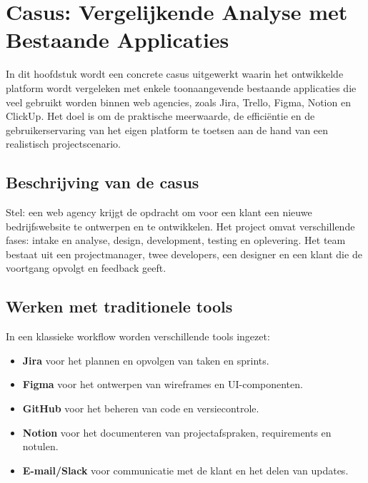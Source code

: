 \chapter{Casus: Vergelijkende Analyse met Bestaande Applicaties}
\label{ch:casus-vergelijking}

In dit hoofdstuk wordt een concrete casus uitgewerkt waarin het ontwikkelde platform wordt vergeleken met enkele toonaangevende bestaande applicaties die veel gebruikt worden binnen web agencies, zoals Jira, Trello, Figma, Notion en ClickUp. Het doel is om de praktische meerwaarde, de efficiëntie en de gebruikerservaring van het eigen platform te toetsen aan de hand van een realistisch projectscenario.

\section{Beschrijving van de casus}
\label{sec:casus-beschrijving}

Stel: een web agency krijgt de opdracht om voor een klant een nieuwe bedrijfswebsite te ontwerpen en te ontwikkelen. Het project omvat verschillende fases: intake en analyse, design, development, testing en oplevering. Het team bestaat uit een projectmanager, twee developers, een designer en een klant die de voortgang opvolgt en feedback geeft.

\section{Werken met traditionele tools}
\label{sec:casus-traditioneel}

In een klassieke workflow worden verschillende tools ingezet:
\begin{itemize}
    \item \textbf{Jira} voor het plannen en opvolgen van taken en sprints.
    \item \textbf{Figma} voor het ontwerpen van wireframes en UI-componenten.
    \item \textbf{GitHub} voor het beheren van code en versiecontrole.
    \item \textbf{Notion} voor het documenteren van projectafspraken, requirements en notulen.
    \item \textbf{E-mail/Slack} voor communicatie met de klant en het delen van updates.
\end{itemize}

